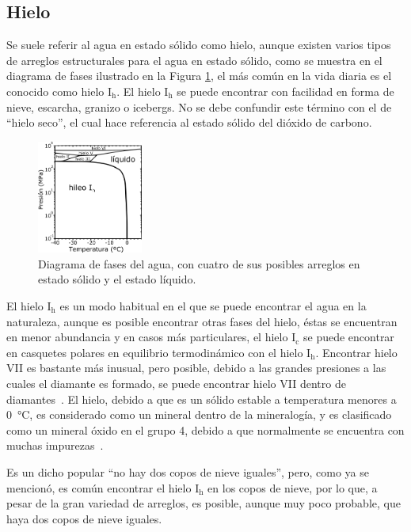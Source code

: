 \subsection{Hielo}

Se suele referir al agua en estado sólido como hielo, aunque existen varios
tipos de arreglos estructurales para el agua en estado sólido, como se muestra
en el diagrama de fases ilustrado en la Figura \ref{diagrama_fases}, el más
común en la vida diaria es el conocido como hielo $\mathrm{I_{h}}$. El hielo
$\mathrm{I_{h}}$ se puede encontrar con facilidad en forma de nieve, escarcha,
granizo o icebergs.  No se debe confundir este término con el de ``hielo
seco'', el cual hace referencia al estado sólido del dióxido de carbono.

\begin{figure} %
    \centering
    \includegraphics[width=0.31\textwidth]{2/img/Phase_diagram_of_water_}
    \caption{Diagrama de fases del agua, con cuatro de sus posibles arreglos en estado sólido y
    el estado líquido.}
    \label{diagrama_fases}
\end{figure}
%
El hielo $\mathrm{I_{h}}$ es un modo habitual en el que se puede encontrar el
agua en la naturaleza, aunque es posible encontrar otras fases del hielo, éstas
se encuentran en menor abundancia y en casos más particulares, el hielo
$\mathrm{I_{c}}$ se puede encontrar en casquetes polares en equilibrio
termodinámico con el hielo $\mathrm{I_{h}}$. Encontrar hielo VII es bastante
más inusual, pero posible, debido a las grandes presiones a las cuales el
diamante es formado, se puede encontrar hielo VII dentro de
diamantes~\cite{Tschauner2018}.  El hielo, debido a que es un sólido estable a
temperatura menores a \SI{0}{\celsius}, es considerado como un mineral dentro
de la mineralogía, y es clasificado como un mineral óxido en el grupo 4, debido
a que normalmente se encuentra con muchas impurezas~\cite{Demirbas2010}.

Es un dicho popular ``no hay dos copos de nieve iguales'', pero, como ya se
mencionó, es común encontrar el hielo $\mathrm{I_{h}}$ en los copos de nieve,
por lo que, a pesar de la gran variedad de arreglos, es posible, aunque muy
poco probable, que haya dos copos de nieve iguales.


